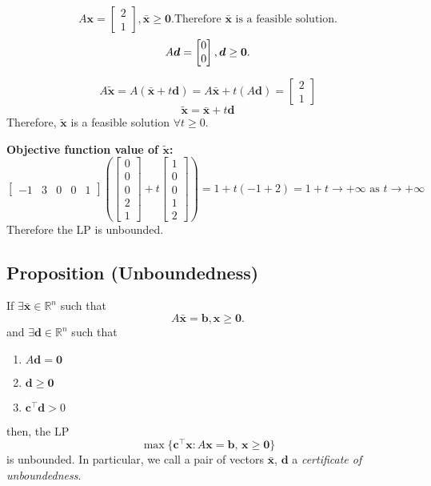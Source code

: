 \[
    A\bm{x}=
    \begin{bmatrix}
        2\\
        1
    \end{bmatrix}, \bar{\bm{x}}\ge \bm{0}.\text{Therefore $\bar{\bm{x}}$ is a feasible solution.}
\]
\[
    A\bm{d}=\begin{bmatrix}
        0\\
        0
    \end{bmatrix}, \bm{d}\ge \bm{0}.\\
\]

\[A\tilde{\bm{x}}=A(\bar{\bm{x}}+t\bm{d})=A\bar{\bm{x}}+t(A\bm{d})=
\begin{bmatrix}
    2\\
    1
\end{bmatrix}\]
\[\tilde{\bm{x}}=\bar{\bm{x}}+t\bm{d}\]
Therefore, $\tilde{\bm{x}}$ is a feasible solution $\forall t\ge 0$.


\textbf{Objective function value of $\tilde{\bm{x}}$:}
\[
\begin{bmatrix}
    -1 & 3 & 0 & 0 & 1
\end{bmatrix}
\left(\begin{bmatrix}
    0\\
    0\\
    0\\
    2\\
    1  
\end{bmatrix}
+
t
\begin{bmatrix}
    1\\
    0\\
    0\\
    1\\
    2
\end{bmatrix}\right)
=
1+t(-1+2)=1+t\rightarrow+\infty \text{ as }t\rightarrow+\infty\]
Therefore the LP is unbounded.


\begin{thmbox}
    \subsection{Proposition (Unboundedness)}
    If $\exists \bm{\bar{x}}\in\mathbb{R}^n$ such that
    \[A\bm{\bar{x}}=\bm{b}, \bm{x}\ge \bm{0}.\]
    and $\exists\bm{d}\in\mathbb{R}^n$ such that
    \begin{enumerate}[(1)]
        \item $A\bm{d}=\bm{0}$
        \item $\bm{d}\ge \bm{0}$
        \item $\bm{c}^\top \bm{d}>0$
    \end{enumerate}
    then, the LP
    \[\max \{\bm{c}^\top \bm{x} : A\bm{x}=\bm{b},\,
    \bm{x}\ge\bm{0}\}\]
    is unbounded. In particular, we call a pair of vectors $\bm{\bar{x}}$, $\bm{d}$ a
    \emph{certificate of unboundedness}.
\end{thmbox}

